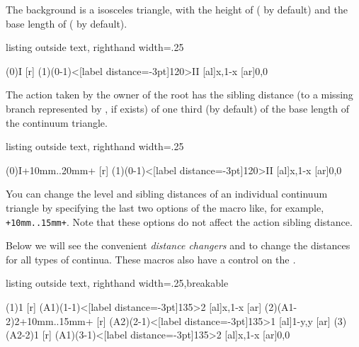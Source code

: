 The background is a isosceles triangle, with the height of \icmd{\cntmlevdist} (\xw{8mm} by default) and the base length of \icmd{\cntmsibdist} (\xw{24mm} by default).

\begin{tcblisting}{listing outside text, righthand width=.25\linewidth}
\begin{istgame}[scale=1.2]
\cntmlevdist{10mm}
\istrootcntm(0){I}
  [r]  \istbm  \endist
\xtdistance{10mm}{20mm}
\istroot(1)(0-1)<[label distance=-3pt]120>{II}
  [al]{x,1-x}  [ar]{0,0}  \endist
\end{istgame}
\end{tcblisting}

The action taken by the owner of the root has the sibling distance (to a missing branch represented by \cmd{\istbm}, if exists) of one third (by default) of the base length of the continuum triangle. 

\begin{tcblisting}{listing outside text, righthand width=.25\linewidth}
\begin{istgame}[scale=1.2]
\xtdistance{10mm}{20mm}
\istrootcntm(0){I}+10mm..20mm+
  [r]    \endist
\istroot(1)(0-1)<[label distance=-3pt]120>{II}
  [al]{x,1-x}  [ar]{0,0}  \endist
\end{istgame}
\end{tcblisting}

You can change the level and sibling distances of an individual continuum triangle by specifying the last two options of the macro \cmd{\istrootcntm} like, for example, \verb|+10mm..15mm+|.
Note that these options do not affect the action sibling distance.

\remark
Below we will see the convenient \emph{distance changers} \cmd{\cntmdistance} and \cmd{\cntmdistance*} to change the distances for all types of continua. These macros also have a control on the \emph{.}


\begin{tcblisting}{listing outside text, righthand width=.25\linewidth,breakable}
\begin{istgame}[font=\scriptsize]
\xtdistance{10mm}{20mm}
\istrootcntm(1){1}                   %
  [r] \istbm \endist
\istroot(A1)(1-1)<[label distance=-3pt]135>{2}
  [al]{x,1-x} [ar]      \endist
\istrootcntm(2)(A1-2){2}+10mm..15mm+ %
  [r] \istbm \endist
\istroot(A2)(2-1)<[label distance=-3pt]135>{1}
  [al]{1-y,y} [ar]      \endist
\istrootcntm(3)(A2-2){1}             %
  [r] \istbm \endist
\istroot(A1)(3-1)<[label distance=-3pt]135>{2}
  [al]{x,1-x} [ar]{0,0} \endist
\end{istgame}
\end{tcblisting}

